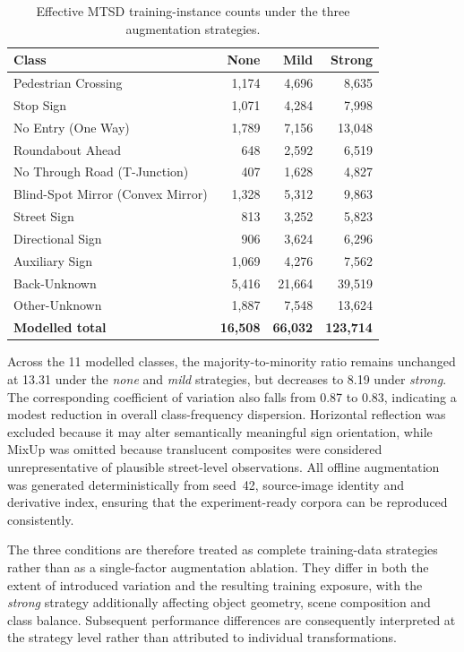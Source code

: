 \begin{table}[H]
\centering
\caption{Effective \gls{MTSD} training-instance counts under the three augmentation strategies.}
\label{tab:mtsd-augmentation-class-balance}
\small
\begin{tabularx}{\textwidth}{@{}Xrrr@{}}
\toprule
\textbf{Class} & \textbf{None} & \textbf{Mild} & \textbf{Strong} \\
\midrule
Pedestrian Crossing & 1,174 & 4,696 & 8,635 \\
Stop Sign & 1,071 & 4,284 & 7,998 \\
No Entry (One Way) & 1,789 & 7,156 & 13,048 \\
Roundabout Ahead & 648 & 2,592 & 6,519 \\
No Through Road (T-Junction) & 407 & 1,628 & 4,827 \\
Blind-Spot Mirror (Convex Mirror) & 1,328 & 5,312 & 9,863 \\
Street Sign & 813 & 3,252 & 5,823 \\
Directional Sign & 906 & 3,624 & 6,296 \\
Auxiliary Sign & 1,069 & 4,276 & 7,562 \\
Back-Unknown & 5,416 & 21,664 & 39,519 \\
Other-Unknown & 1,887 & 7,548 & 13,624 \\
\midrule
\textbf{Modelled total} & \textbf{16,508} & \textbf{66,032} & \textbf{123,714} \\
\bottomrule
\end{tabularx}
\end{table}

\noindent Across the 11 modelled classes, the majority-to-minority ratio remains unchanged at 13.31 under the \emph{none} and \emph{mild} strategies, but decreases to 8.19 under \emph{strong}. The corresponding coefficient of variation also falls from 0.87 to 0.83, indicating a modest reduction in overall class-frequency dispersion. Horizontal reflection was excluded because it may alter semantically meaningful sign orientation, while MixUp was omitted because translucent composites were considered unrepresentative of plausible street-level observations. All offline augmentation was generated deterministically from seed~42, source-image identity and derivative index, ensuring that the experiment-ready corpora can be reproduced consistently.

The three conditions are therefore treated as complete training-data strategies rather than as a single-factor augmentation ablation. They differ in both the extent of introduced variation and the resulting training exposure, with the \emph{strong} strategy additionally affecting object geometry, scene composition and class balance. Subsequent performance differences are consequently interpreted at the strategy level rather than attributed to individual transformations.

